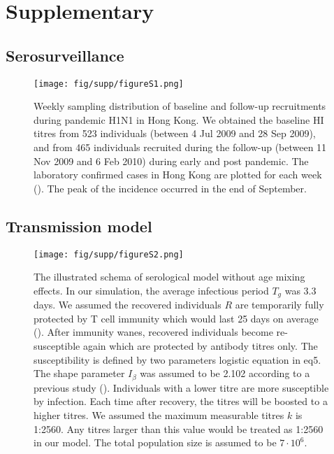 \documentclass{article}
\newcommand{\beginsupplement}{%
      \setcounter{table}{0}
      \renewcommand{\thetable}{S\arabic{table}}%
      \setcounter{figure}{0}
      \renewcommand{\thefigure}{S\arabic{figure}}%
   }
\begin{document}
%

\newpage
\section{Supplementary}
\beginsupplement
\subsection{Serosurveillance}
\begin{figure}[h!]
      \texttt{[image: fig/supp/figureS1.png]}
      \caption{Weekly sampling distribution of baseline and follow-up recruitments during pandemic H1N1 in Hong Kong. We obtained the baseline HI titres from 523 individuals (between 4 Jul 2009 and 28 Sep 2009), and from 465 individuals recruited during the follow-up (between 11 Nov 2009 and 6 Feb 2010) during early and post pandemic. The laboratory confirmed cases in Hong Kong are plotted for each week (\cite{Riley2011}). The peak of the incidence occurred in the end of September.}
\end{figure}
  \clearpage

\subsection{Transmission model}
\begin{figure}[h!]
      \texttt{[image: fig/supp/figureS2.png]}
      \caption{The illustrated schema of serological model without age mixing effects. In our simulation, the average infectious period $T_{g}$ was 3.3 days. We assumed the recovered individuals \textit{$R$} are temporarily fully protected by T cell immunity which would last 25 days on average (\cite{Kaech2012}). After immunity wanes, recovered individuals become re-susceptible again which are protected by antibody titres only. The susceptibility is defined by two parameters logistic equation in eq5. The shape parameter $I_{\beta}$ was assumed to be 2.102 according to a previous study (\cite{Coudeville2010}). Individuals with a lower titre are more susceptible by infection. Each time after recovery, the titres will be boosted to a higher titres. We assumed the maximum measurable titres $k$ is 1:2560. Any titres larger than this value would be treated as 1:2560 in our model. The total population size is assumed to be $7\cdot10^{6}$.}
\end{figure}

\clearpage
\end{document}
